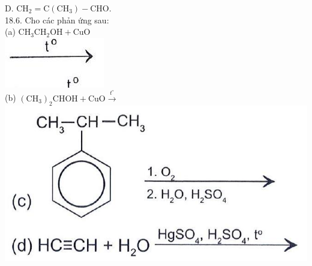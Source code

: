 \documentclass[10pt]{article}
\begin{document}
D. $\mathrm{CH}_{2}=\mathrm{C}\left(\mathrm{CH}_{3}\right)-\mathrm{CHO}$.\\
18.6. Cho các phản ứng sau:\\
(a) $\mathrm{CH}_{3} \mathrm{CH}_{2} \mathrm{OH}+\mathrm{CuO}$\\
\includegraphics[max width=\textwidth, center]{2025_10_23_ae7aef68fb3b41082d29g-43(1)}\\
(b) $\left(\mathrm{CH}_{3}\right)_{2} \mathrm{CHOH}+\mathrm{CuO} \xrightarrow{t^{\circ}}$\\
\includegraphics[max width=\textwidth, center]{2025_10_23_ae7aef68fb3b41082d29g-44}
\end{document}
